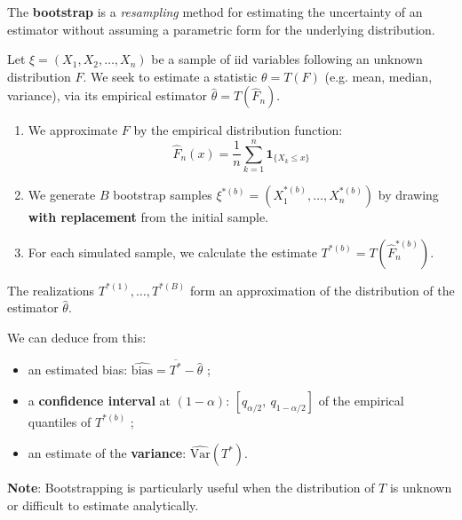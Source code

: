 \begin{f}
	
	The \textbf{bootstrap} is a \textit{resampling} method for estimating the uncertainty of an estimator without assuming a parametric form for the underlying distribution.
	
	Let \(\xi = (X_1, X_2, \ldots, X_n)\) be a sample of iid variables following an unknown distribution \(F\). We seek to estimate a statistic \(\theta = T(F)\) (e.g. mean, median, variance), via its empirical estimator \(\hat{\theta} = T(\hat{F}_n)\).
	
	\begin{enumerate}
		\item We approximate \(F\) by the empirical distribution function:
		\[
		\hat{F}_n(x) = \frac{1}{n} \sum_{k=1}^n \mathbf{1}_{\{X_k \le x\}}
		\]
		
		\item We generate \(B\) bootstrap samples \(\xi^{\ast(b)} = (X_1^{\ast(b)}, \ldots, X_n^{\ast(b)})\) by drawing \textbf{with replacement} from the initial sample.
		
		\item For each simulated sample, we calculate the estimate \(T^{\ast(b)} = T(\hat{F}_n^{\ast(b)})\).
	\end{enumerate}
	
	The realizations \(T^{\ast(1)}, \ldots, T^{\ast(B)}\) form an approximation of the distribution of the estimator \(\hat{\theta}\).
	
	We can deduce from this:
	\begin{itemize}[nosep]
		\item an estimated bias: \(\widehat{\text{bias}} = \overline{T^\ast} - \hat{\theta}\) ;
		\item a \textbf{confidence interval} at \((1-\alpha)\): \([q_{\alpha/2},\ q_{1 - \alpha/2}]\) of the empirical quantiles of \(T^{\ast(b)}\) ;
		\item an estimate of the \textbf{variance}: \(\widehat{\mathrm{Var}}(T^\ast)\).
	\end{itemize}
	
	\textbf{Note}: Bootstrapping is particularly useful when the distribution of \(T\) is unknown or difficult to estimate analytically.
	
\end{f}
